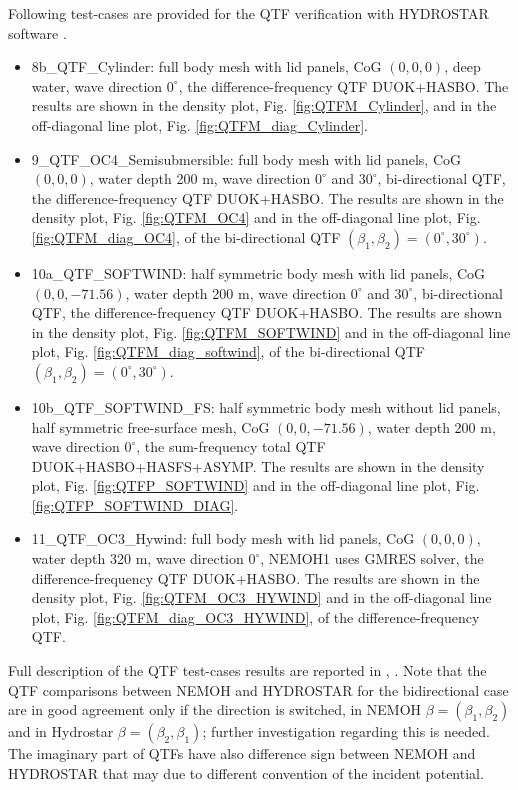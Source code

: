 \documentclass[12pt,a4paper,titlepage]{article}
\begin{document}
Following test-cases are provided for the QTF verification with HYDROSTAR software \cite{HYDROSTAR}.
\begin{itemize}
\item 8b\_QTF\_Cylinder: full body mesh with lid panels, CoG $(0,0,0)$, deep water, wave direction $0^{\circ}$, the difference-frequency QTF DUOK+HASBO. The results are shown in the density plot, Fig. \ref{fig:QTFM_Cylinder}, and in the off-diagonal line plot, Fig. \ref{fig:QTFM_diag_Cylinder}.
\item 9\_QTF\_OC4\_Semisubmersible: full body mesh with lid panels, CoG $(0,0,0)$, water depth 200 m, wave direction $0^{\circ}$ and $30^{\circ}$, bi-directional QTF, the difference-frequency QTF DUOK+HASBO. The results are shown in the density plot, Fig. \ref{fig:QTFM_OC4} and in the off-diagonal line plot, Fig. \ref{fig:QTFM_diag_OC4}, of the bi-directional QTF $(\beta_1,\beta_2)=(0^{\circ},30^{\circ})$.
\item 10a\_QTF\_SOFTWIND: half symmetric body mesh with lid panels, CoG $(0,0,-71.56)$, water depth 200 m, wave direction $0^{\circ}$ and $30^{\circ}$, bi-directional QTF, the difference-frequency QTF DUOK+HASBO. The results are shown in the density plot, Fig. \ref{fig:QTFM_SOFTWIND} and in the off-diagonal line plot, Fig. \ref{fig:QTFM_diag_softwind}, of the bi-directional QTF $(\beta_1,\beta_2)=(0^{\circ},30^{\circ})$.
\item 10b\_QTF\_SOFTWIND\_FS: half symmetric body mesh without lid panels, half symmetric free-surface mesh, CoG $(0,0,-71.56)$, water depth 200 m, wave direction $0^{\circ}$, the sum-frequency total QTF DUOK+HASBO+HASFS+ASYMP. The results are shown in the density plot, Fig. \ref{fig:QTFP_SOFTWIND} and in the off-diagonal line plot, Fig. \ref{fig:QTFP_SOFTWIND_DIAG}.
\item 11\_QTF\_OC3\_Hywind: full body mesh with lid panels, CoG $(0,0,0)$, water depth 320 m, wave direction $0^{\circ}$, NEMOH1 uses GMRES solver, the difference-frequency QTF DUOK+HASBO. The results are shown in the density plot, Fig. \ref{fig:QTFM_OC3_HYWIND} and in the off-diagonal line plot, Fig. \ref{fig:QTFM_diag_OC3_HYWIND}, of the difference-frequency QTF.
\end{itemize}
Full description of the QTF test-cases results are reported in \cite{Kurnia22_JH}, \citep{Kurnia22}. Note that the QTF comparisons between NEMOH and HYDROSTAR for the bidirectional case are in good agreement only if the direction is switched, in NEMOH $\beta=(\beta_1,\beta_2)$ and in Hydrostar $\beta=(\beta_2,\beta_1)$; further investigation regarding this is needed. The imaginary part of QTFs have also difference sign between NEMOH and HYDROSTAR that may due to different convention of the incident potential.
\end{document}
